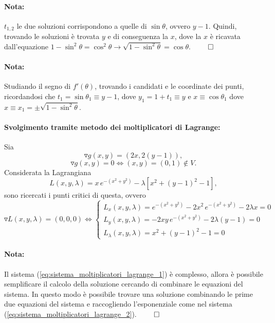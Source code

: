 \begin{example}
	\paragraph{Nota:}  $t_{1,2}$ le due soluzioni corrispondono a quelle di $\sin\theta$, ovvero $y-1$. Quindi, trovando le soluzioni è trovata $y$ e di conseguenza la $x$, dove la $x$ è ricavata dall'equazione $1-\sin^2\theta = \cos^2\theta\rightarrow\sqrt{1-\sin^2\theta} = \cos\theta$. $\qed$
	
	\paragraph{Nota:} Studiando il segno di $f'(\theta)$, trovando i candidati e le coordinate dei punti, ricordandosi che $t_1 = \sin\theta_1 \equiv y-1$, dove $y_1 = 1 + t_1 \equiv y$ e $x\equiv\cos\theta_1$ dove $x \equiv x_1 = \pm\sqrt{1-\sin^2\theta}$.
	
	\paragraph{Svolgimento tramite metodo dei moltiplicatori di Lagrange:} Sia
	\begin{equation*}
		\triangledown g(x,y) = (2x,2(y-1)),
	\end{equation*}
	\begin{equation*}
		\triangledown g(x,y) = 0 \iff (x,y) = (0,1)\notin V.
	\end{equation*}
	Considerata la Lagrangiana
	\begin{equation*}
		L(x,y,\lambda) = x\, e^{-(x^2+y^2)} - \lambda[x^2 + (y-1)^2 - 1],
 	\end{equation*}
 	sono ricercati i punti critici di questa, ovvero
 	\begin{equation}\label{eq:sistema_moltiplicatori_lagrange_1}
 		\triangledown L(x,y,\lambda) = (0,0,0) \iff
 		\begin{cases}
 			L_x (x,y,\lambda) = e^{-(x^2+y^2)} - 2x^2\, e^{-(x^2+y^2)} - 2\lambda x=0\\
 			L_y (x,y,\lambda) = -2xy\, e^{-(x^2+y^2)} - 2\lambda (y-1) = 0\\
 			L_\lambda (x,y,\lambda) = x^2 + (y-1)^2 -1 = 0
 		\end{cases}
 	\end{equation}
 	
 	\paragraph{Nota:} Il sistema (\ref{eq:sistema_moltiplicatori_lagrange_1}) è complesso, allora è possibile semplificare il calcolo della soluzione cercando di combinare le equazioni del sistema. In questo modo è possibile trovare una soluzione combinando le prime due equazioni del sistema e raccogliendo l'esponenziale come nel sistema (\ref{eq:sistema_moltiplicatori_lagrange_2}). $\qed$
 	

\end{example}
